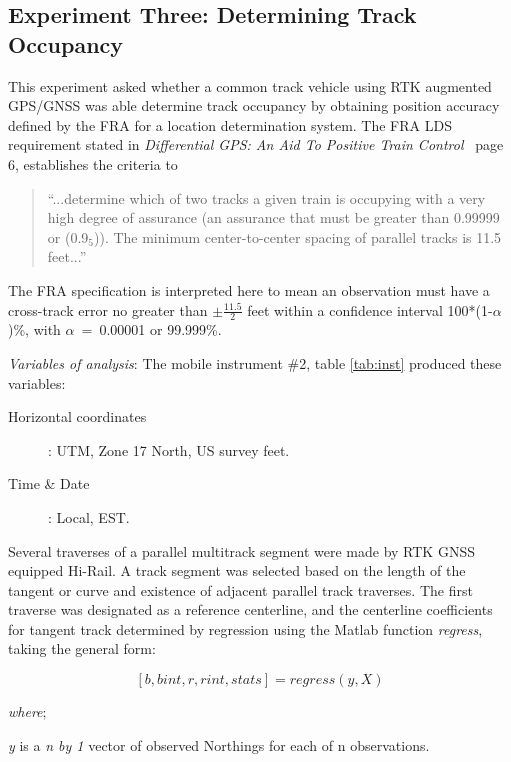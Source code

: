 \subsection{Experiment Three: Determining Track Occupancy} 
This experiment asked whether a common track vehicle using RTK augmented GPS/GNSS was able determine track occupancy by obtaining position accuracy defined by the FRA for a location determination system. The FRA LDS requirement stated in \emph{Differential GPS: An Aid To Positive Train Control}~\citep{1995FRADiffe} page 6, establishes the criteria to\\
\begin{quotation}
``...determine which of two tracks a given train is occupying with a very high degree of assurance (an assurance that must be greater than 0.99999 or (0.9$_5$)). The minimum center-to-center spacing of parallel tracks is 11.5 feet...''~\citep{1995FRADiffe}\\
\end{quotation}
The FRA specification is interpreted here to mean an observation must have a cross-track error no greater than $\pm \frac{11.5}{2}$ feet within a confidence interval 100*(1-${\alpha}$)\%, with ${\alpha}$~=~0.00001 or 99.999\%.

\emph{Variables of analysis}: The mobile instrument \#2, table \ref{tab:inst} produced these variables:
\begin{description}
	\item [Horizontal coordinates]: UTM, Zone 17 North, US survey feet.
	\item [Time \& Date]: Local, EST.
\end{description}

Several traverses of a parallel multitrack segment were made by RTK GNSS equipped Hi-Rail. A track segment was selected based on the length of the tangent or curve and existence of adjacent parallel track traverses. The first traverse was designated as a reference centerline, and the centerline coefficients for tangent track determined by regression using the Matlab function \emph{regress}, taking the general form:

\begin{equation}
\label{tanReg}
[b,bint,r,rint,stats] = regress ( y, X)
\end{equation}

\emph{where};

\emph{y} is a \emph{n by 1} vector of observed Northings for each of n observations.

